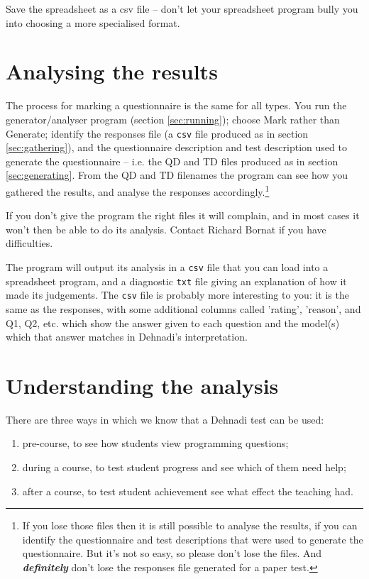 \documentclass[11pt,a4paper]{article}
\newcommand{\rbparagraph}{}
\newcommand{\seclabel}[1]{\label{sec:#1}}
\newcommand{\secref}[1]{section \ref{sec:#1}}
\begin{document}
Save the spreadsheet as a csv file -- don't let your spreadsheet program bully you into choosing a more specialised format.

\section{Analysing the results}
\seclabel{marking}
\rbparagraph{}
The process for marking a questionnaire is the same for all types. You run the generator/analyser program (\secref{running}); choose Mark rather than Generate; identify the responses file (a \texttt{csv} file produced as in \secref{gathering}), and the questionnaire description and test description used to generate the questionnaire -- i.e. the QD and TD files produced as in \secref{generating}. From the QD and TD filenames the program can see how you gathered the results, and analyse the responses accordingly.\footnote{If you lose those files then it is still possible to analyse the results, if you can identify the questionnaire and test descriptions that were used to generate the questionnaire. But it's not so easy, so please don't lose the files. And \textbf{\textit{definitely}} don't lose the responses file generated for a paper test.}

If you don't give the program the right files it will complain, and in most cases it won't then be able to do its analysis. Contact Richard Bornat if you have difficulties.

The program will output its analysis in a \texttt{csv} file that you can load into a spreadsheet program, and a diagnostic \texttt{txt} file giving an explanation of how it made its judgements. The \texttt{csv} file is probably more interesting to you: it is the same as the responses, with some additional columns called 'rating', 'reason', and Q1, Q2, etc. which show the answer given to each question and the model(s) which that answer matches in Dehnadi's interpretation. 

\section{Understanding the analysis} 
\seclabel{interpreting}

There are three ways in which we know that a Dehnadi test can be used:
\begin{enumerate}
\item pre-course, to see how students view programming questions;
\item during a course, to test student progress and see which of them need help;
\item after a course, to test student achievement see what effect the teaching had.
\end{enumerate}
\end{document}
